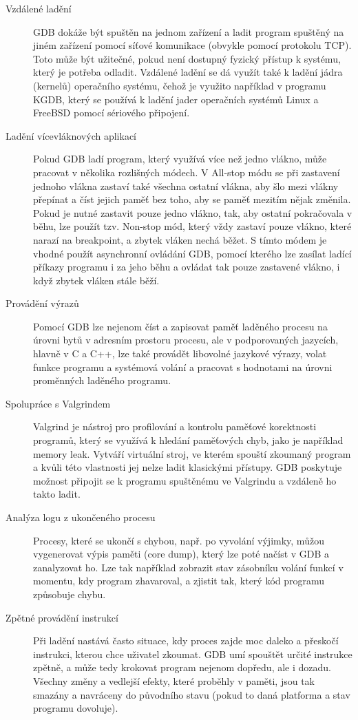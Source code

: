 \documentclass[bc,male,java,dept460]{diploma}						%
\begin{document}
		\begin{description}
			\item[Vzdálené ladění]
				GDB dokáže být spuštěn na jednom zařízení a ladit program spuštěný na jiném zařízení pomocí síťové komunikace (obvykle pomocí protokolu TCP).
				Toto může být užitečné, pokud není dostupný fyzický přístup k systému, který je potřeba odladit.
				Vzdálené ladění se dá využít také k ladění jádra (kernelů) operačního systému, čehož je využito například v programu KGDB, který se používá k ladění
				jader operačních systémů Linux a FreeBSD pomocí sériového připojení.
			\item[Ladění vícevláknových aplikací]
				Pokud GDB ladí program, který využívá více než jedno vlákno, může pracovat v několika rozlišných módech\cite{gdb-multithreading}.
				V All-stop módu se při zastavení jednoho vlákna zastaví také všechna ostatní vlákna, aby šlo mezi vlákny přepínat a číst jejich paměť bez toho,
				aby se paměť mezitím nějak změnila. Pokud je nutné zastavit pouze jedno vlákno, tak, aby ostatní pokračovala v běhu, lze použít tzv. Non-stop mód,
				který vždy zastaví pouze vlákno, které narazí na breakpoint, a zbytek vláken nechá běžet. S tímto módem je vhodné použít asynchronní ovládání GDB,
				pomocí kterého lze zasílat ladící příkazy programu i za jeho běhu a ovládat tak pouze zastavené vlákno, i když zbytek vláken stále běží.
			\item[Provádění výrazů]
				Pomocí GDB lze nejenom číst a zapisovat paměť laděného procesu na úrovni bytů v adresním prostoru procesu, ale v podporovaných jazycích, hlavně
				v C a C++, lze také provádět libovolné jazykové výrazy, volat funkce programu a systémová volání a pracovat s hodnotami na úrovni proměnných
				laděného programu.
			\item[Spolupráce s Valgrindem]
				Valgrind je nástroj pro profilování a kontrolu paměťové korektnosti programů, který se využívá k hledání paměťových chyb, jako je například memory
				leak. Vytváří virtuální stroj, ve kterém spouští zkoumaný program a kvůli této vlastnosti jej nelze ladit klasickými přístupy. GDB poskytuje
				možnost připojit se k programu spuštěnému ve Valgrindu a vzdáleně ho takto ladit.
			\item[Analýza logu z ukončeného procesu]
				Procesy, které se ukončí s chybou, např. po vyvolání výjimky, můžou vygenerovat výpis paměti (core dump), který lze poté načíst v GDB a zanalyzovat ho.
				Lze tak například zobrazit stav zásobníku volání funkcí v momentu, kdy program zhavaroval, a zjistit tak, který kód programu způsobuje chybu.
			\item[Zpětné provádění instrukcí]
				Při ladění nastává často situace, kdy proces zajde moc daleko a přeskočí instrukci, kterou chce uživatel zkoumat. GDB umí spouštět určité instrukce
				zpětně, a může tedy krokovat program nejenom dopředu, ale i dozadu. Všechny změny a vedlejší efekty, které proběhly v paměti, jsou tak smazány a
				navráceny do původního stavu (pokud to daná platforma a stav programu dovoluje).
		\end{description}
		
\end{document}

